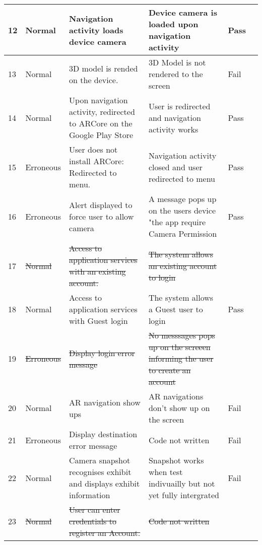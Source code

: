 \begin{turn}{-0}
\begin{tabular}{ | l | l | p{9cm} | p{10.5cm} | l | l |}
	12 & Normal & Navigation activity loads device camera & Device camera is loaded upon navigation activity & \cellcolor{green}Pass\\ \hline
	
	13 & Normal & 3D model is rended on the device. & 3D Model is not rendered to the screen & \cellcolor{red}Fail\\ \hline
	
	14 & Normal & Upon navigation activity, redirected to ARCore on the Google Play Store & User is redirected and navigation activity works & \cellcolor{green}Pass\\ \hline
	
	15 & Erroneous & User does not install ARCore: Redirected to menu. & Navigation activity closed and user redirected to menu & \cellcolor{green}Pass\\ \hline
	
	16 & Erroneous & Alert displayed to force user to allow camera & A message pops up on the users device "the app require Camera Permission & \cellcolor{green}Pass\\ \hline
	
	17 & \sout{Normal} & \sout{Access to application services with an existing account.} & \sout{The system allows an existing account to login} & \\ \hline
	
	18 & Normal & Access to application services with Guest login & The system allows a Guest user  to login & \cellcolor{green}Pass\\ \hline
	
	19 & \sout{Erroneous} & \sout{Display login error message} & \sout{No messsages pops up on the screeen informing the user to create an account} &\\ \hline
	
	20 & Normal & AR navigation show ups & AR navigations don't show up on the screen & \cellcolor{red}Fail\\ \hline
	
	21 & Erroneous & Display destination error message & Code not written & \cellcolor{red}Fail\\ \hline
	
	22 & Normal & Camera snapshot recognises exhibit and displays exhibit information & Snapshot works when test indivuailly but not yet fully intergrated & \cellcolor{red}Fail\\ \hline
	
	23 & \sout{Normal} & \sout{User can enter credentials to register an Account.} & \sout{Code not written} &\\ \hline
	

\end{tabular}
\end{turn}
